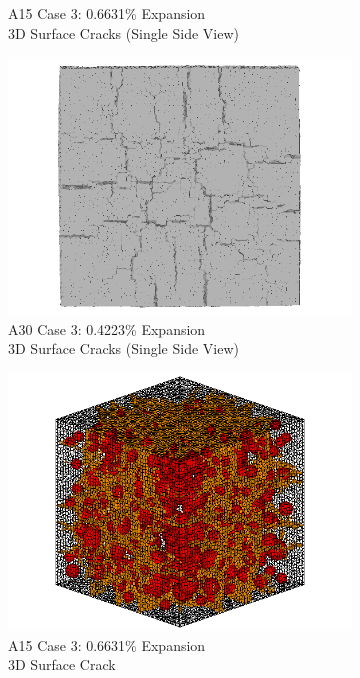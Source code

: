 \begin{figure}[ht!]
\begin{subfigure}{.5\textwidth}
    \caption{A15 Case 3: 0.6631\% Expansion \\ 3D Surface Cracks (Single Side View)}
    \end{subfigure}%
    \begin{subfigure}{.5\textwidth}
      \centering
      \includegraphics[width=.8\linewidth]{Files/exp_3D/DEF/A30X0C_3_3ds.png}
    \caption{A30 Case 3: 0.4223\% Expansion\\ 3D Surface Cracks (Single Side View)}
    \end{subfigure}
    \begin{subfigure}{.5\textwidth}
      \centering
      \includegraphics[width=.8\linewidth]{Files/exp_3D/DEF/A15X0C_3_c.png}
    \caption{A15 Case 3: 0.6631\% Expansion \\ 3D Surface Crack}
    \end{subfigure}%
    \begin{subfigure}{.5\textwidth}
      \centering

\end{subfigure}
\end{figure}
